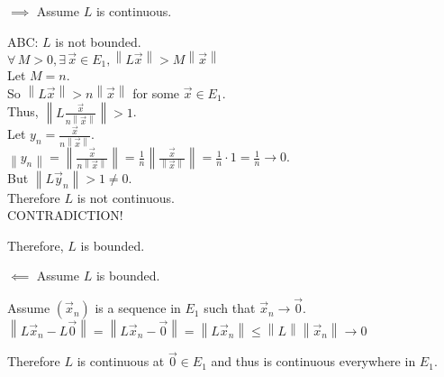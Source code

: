 \documentclass[letterpaper,12pt,fleqn]{article}
\newcommand{\vx}{\vec{x}}
\newcommand{\vy}{\vec{y}}
\newcommand{\vo}{\vec{0}}
\newcommand{\norm}[1]{\left\|#1\right\|}
\begin{document}
\begin{theproof}
  \listbreak
  \begin{description}
  \item $\implies$ Assume $L$ is continuous.

    ABC: $L$ is not bounded. \\
    $\forall\,M>0,\exists\,\vx\in E_1,\norm{L\vx}>M\norm{\vx}$ \\
    Let $M=n$. \\
    So $\norm{L\vx}>n\norm{\vx}$ for some $\vx\in E_1$. \\
    Thus, $\norm{L\frac{\vx}{n\norm{\vx}}}>1$. \\
    Let $y_n=\frac{\vx}{n\norm{\vx}}$. \\
    $\norm{y_n}=\norm{\frac{\vx}{n\norm{\vx}}}=
    \frac{1}{n}\norm{\frac{\vx}{\norm{\vx}}}=\frac{1}{n}\cdot1=
    \frac{1}{n}\to0$. \\
    But $\norm{L\vy_n}>1\ne0$. \\
    Therefore $L$ is not continuous. \\
    CONTRADICTION!

    Therefore, $L$ is bounded.

  \item $\impliedby$ Assume $L$ is bounded.

    Assume $(\vx_n)$ is a sequence in $E_1$ such that $\vx_n\to\vo$. \\
    $\norm{L\vx_n-L\vo}=\norm{L\vx_n-\vo}=\norm{L\vx_n}\le
    \norm{L}\norm{\vx_n}\to0$

    Therefore $L$ is continuous at $\vo\in E_1$ and thus is continuous
    everywhere in $E_1$.
  \end{description}
\end{theproof}
\end{document}
